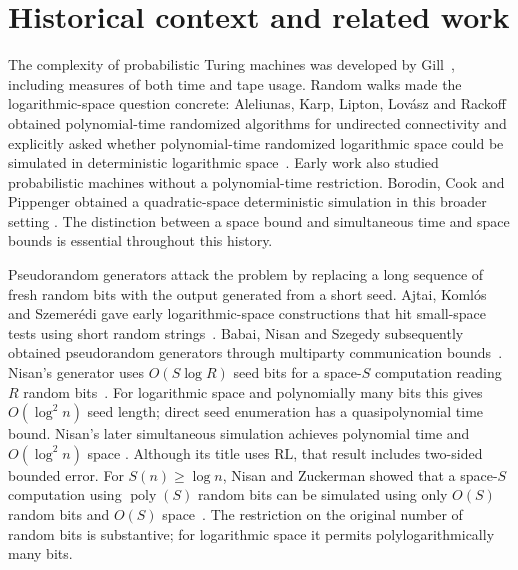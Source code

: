\section{Historical context and related work}


The complexity of probabilistic Turing machines was developed by
Gill~\cite{Gill1977}, including measures of both time and tape usage.
Random walks made the logarithmic-space question concrete:
Aleliunas, Karp, Lipton, Lov\'asz and Rackoff obtained polynomial-time
randomized algorithms for undirected connectivity and explicitly asked
whether polynomial-time randomized logarithmic space could be simulated
in deterministic logarithmic space~\cite{AleliunasKLLR1979}.
Early work also studied probabilistic machines without a polynomial-time
restriction. Borodin, Cook and Pippenger obtained a quadratic-space
deterministic simulation in this broader setting
\cite{BorodinCookPippenger1983}.
The distinction between a space bound and simultaneous time and space
bounds is essential throughout this history.

Pseudorandom generators attack the problem by replacing a long sequence
of fresh random bits with the output generated from a short seed.
Ajtai, Koml\'os and Szemer\'edi gave early logarithmic-space
constructions that hit small-space tests using short random
strings~\cite{AjtaiKomlosSzemeredi1987}. Babai, Nisan and Szegedy
subsequently obtained pseudorandom generators through multiparty
communication bounds~\cite{BabaiNisanSzegedy1992}.
Nisan's generator uses $O(S\log R)$ seed bits for a space-$S$
computation reading $R$ random bits~\cite{Nisan1992}.
For logarithmic space and polynomially many bits this gives
$O(\log^2 n)$ seed length; direct seed enumeration has a
quasipolynomial time bound. Nisan's later simultaneous simulation
achieves polynomial time and $O(\log^2 n)$ space
\cite{Nisan1994RLinSC}. Although its title uses $\mathrm{RL}$,
that result includes two-sided bounded error.
For $S(n)\ge\log n$, Nisan and Zuckerman showed that a space-$S$
computation using $\operatorname{poly}(S)$ random bits can be simulated
using only $O(S)$ random bits and $O(S)$ space~\cite{NisanZuckerman1996}.
The restriction on the original number of random bits is substantive;
for logarithmic space it permits polylogarithmically many bits.


